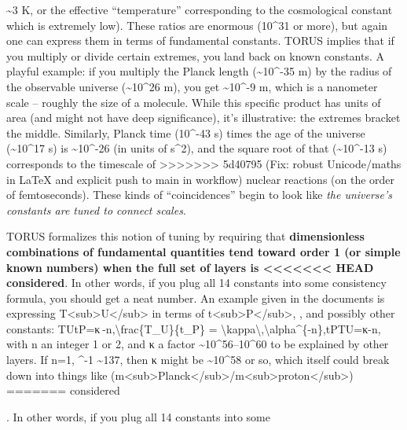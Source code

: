\documentclass[]{article}
\begin{document}
{\begin{itemize}
  \textasciitilde{}3 K, or the effective ``temperature'' corresponding
  to the cosmological constant which is extremely low). These ratios are
  enormous (10\^{}31 or more), but again one can express them in terms
  of fundamental constants. TORUS implies that if you multiply or divide
  certain extremes, you land back on known constants. A playful example:
  if you multiply the Planck length (\textasciitilde{}10\^{}-35 m) by
  the radius of the observable universe (\textasciitilde{}10\^{}26 m),
  you get \textasciitilde{}10\^{}-9 m, which is a nanometer scale --
  roughly the size of a molecule. While this specific product has units
  of area (and might not have deep significance), it's illustrative: the
  extremes bracket the middle. Similarly, Planck time (10\^{}-43 s)
  times the age of the universe (\textasciitilde{}10\^{}17 s) is
  \textasciitilde{}10\^{}-26 (in units of s\^{}2), and the square root
  of that (\textasciitilde{}10\^{}-13 s) corresponds to the timescale of
>>>>>>> 5d40795 (Fix: robust Unicode/maths in LaTeX and explicit push to main in workflow)
  nuclear reactions (on the order of femtoseconds). These kinds of
  ``coincidences'' begin to look like \emph{the universe's constants are
  tuned to connect scales}.
\end{itemize}

TORUS formalizes this notion of tuning by requiring that
\textbf{dimensionless combinations of fundamental quantities tend toward
order 1 (or simple known numbers) when the full set of layers is
<<<<<<< HEAD
considered}\hspace{0pt}. In other words, if you plug all 14 constants
into some consistency formula, you should get a neat number. An example
given in the documents is expressing
T\textless sub\textgreater U\textless/sub\textgreater{} in terms of
t\textless sub\textgreater P\textless/sub\textgreater, \alpha, and possibly
other constants: TUtP=κ \alpha-n,\textbackslash frac\{T\_U\}\{t\_P\} =
\textbackslash kappa\textbackslash,\textbackslash alpha\^{}\{-n\},tP\hspace{0pt}TU\hspace{0pt}\hspace{0pt}=κ\alpha-n,
with n an integer 1 or 2, and κ a factor
\textasciitilde10\^{}56--10\^{}60 to be explained by other
layers\hspace{0pt}. If n=1, \alpha\^{}-1 \textasciitilde137, then κ might be
\textasciitilde10\^{}58 or so, which itself could break down into things
like
(m\textless sub\textgreater Planck\textless/sub\textgreater/m\textless sub\textgreater proton\textless/sub\textgreater)
=======
considered}​. In other words, if you plug all 14 constants into some
\end{document}
